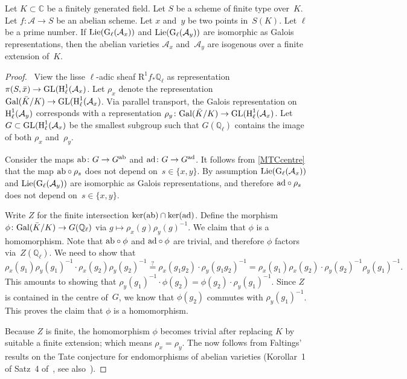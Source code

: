 \documentclass[10pt,twoside,leqno]{article}
\numberwithin{equation}{subsection}
\let\qed\relax
\newcommand{\QQ}{\mathbb{Q}}
\newcommand{\QQl}{\QQ_{\ell}}
\newcommand{\CC}{\mathbb{C}}
\newcommand{\Gal}{\textnormal{Gal}}
\newcommand{\GL}{\textnormal{GL}}
\newcommand{\Lie}{\textnormal{Lie}}
\newcommand{\ab}{\textnormal{ab}}
\newcommand{\ad}{\textnormal{ad}}
\newcommand{\HH}{\textnormal{H}}
\newcommand{\Hl}{\HH_{\ell}}
\newcommand{\GG}{\textnormal{G}}
\newcommand{\Gl}{\GG_{\ell}}
\begin{document}
\begin{proposition} \label{twofib} %
 Let \(K \subset \CC\) be a finitely generated field.
 Let \(S\) be a scheme of finite type over~\(K\).
 Let \(f \colon \mathcal{A} \to S\) be an abelian scheme.
 Let \(x\) and~\(y\) be two points in~\(S(K)\).
 Let \(\ell\) be a prime number.
 If \(\Lie(\Gl(\mathcal{A}_{x}))\) and \(\Lie(\Gl(\mathcal{A}_{y}))\)
 are isomorphic as Galois representations,
 then the abelian varieties \(\mathcal{A}_{x}\) and~\(\mathcal{A}_{y}\)
 are isogenous over a finite extension of~\(K\).
\end{proposition}
\begin{proof}
 \pf\ View the lisse \(\ell\)-adic sheaf \(\mathrm{R}^{1}f_{*}\QQl\)
 as representation
 \(\pi(S,\bar{x}) \to \GL(\Hl^{1}(\mathcal{A}_{x})\).
 Let \(\rho_{x}\) denote the representation
 \(\Gal(\bar{K}/K) \to \GL(\Hl^{1}(\mathcal{A}_{x})\).
 Via parallel transport,
 the Galois representation on~\(\Hl^{1}(\mathcal{A}_{y})\)
 corresponds with a representation
 \(\rho_{y} \colon \Gal(\bar{K}/K) \to \GL(\Hl^{1}(\mathcal{A}_{x})\).
 Let \(G \subset \GL(\Hl^{1}(\mathcal{A}_{x})\) be the smallest
 subgroup such that \(G(\QQl)\) contains the image
 of both \(\rho_{x}\) and~\(\rho_{y}\).

 Consider the maps \(\ab \colon G \to G^{\ab}\)
 and \(\ad \colon G \to G^{\ad}\).
 It follows from \cref{MTCcentre} that
 the map \(\ab \circ \rho_{s}\) does not depend on~\(s \in \{x,y\}\).
 By assumption
 \(\Lie(\Gl(\mathcal{A}_{x}))\) and \(\Lie(\Gl(\mathcal{A}_{y}))\)
 are isomorphic as Galois representations,
 and therefore \(\ad \circ \rho_{s}\) does not depend on~\(s \in \{x,y\}\).

 Write \(Z\) for the finite intersection \(\ker(\ab) \cap \ker(\ad)\).
 Define the morphism \(\phi \colon \Gal(\bar{K}/K) \to G(\QQl)\)
 via \(g \mapsto \rho_{x}(g)\rho_{y}(g)^{-1}\).
 We claim that \(\phi\) is a homomorphism.
 Note that \(\ab \circ \phi\) and \(\ad \circ \phi\)
 are trivial, and therefore \(\phi\) factors via~\(Z(\QQl)\).
 We need to show that
 \[
  \rho_{x}(g_{1})\rho_{y}(g_{1})^{-1} \cdot \rho_{x}(g_{2})\rho_{y}(g_{2})^{-1}
  \stackrel{?}{=}
  \rho_{x}(g_{1}g_{2}) \cdot \rho_{y}(g_{1}g_{2})^{-1}
  =
  \rho_{x}(g_{1})\rho_{x}(g_{2}) \cdot
  \rho_{y}(g_{2})^{-1}\rho_{y}(g_{1})^{-1}.
 \]
 This amounts to showing that
 \(\rho_{y}(g_{1})^{-1} \cdot \phi(g_{2}) =
  \phi(g_{2}) \cdot \rho_{y}(g_{1})^{-1}\).
 Since \(Z\) is contained in the centre of~\(G\),
 we know that \(\phi(g_{2})\) commutes with \(\rho_{y}(g_{1})^{-1}\).
 This proves the claim that \(\phi\) is a homomorphism.

 Because \(Z\) is finite,
 the homomorphism \(\phi\) becomes trivial
 after replacing \(K\) by suitable a finite extension;
 which means \(\rho_{x} = \rho_{y}\).
 The  now follows from Faltings' results
 on the Tate conjecture for endomorphisms of abelian varieties
 (Korollar~1 of Satz~4 of~\cite{Fal83}, see also~\cite{Fal84}). \qed
\end{proof}
\end{document}
